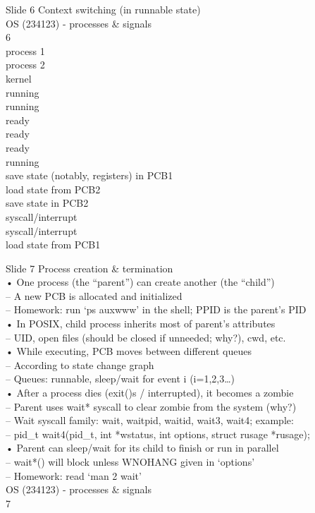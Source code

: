 \documentclass{beamer}
\begin{document}
\begin{frame}{Slide 6}
Context switching (in runnable state)\\OS (234123) - processes \& signals\\6\\process 1\\process 2\\kernel\\running\\running\\ready\\ready\\ready\\running\\save state (notably, registers) in PCB1\\load state from PCB2\\save state in PCB2\\syscall/interrupt\\syscall/interrupt\\load state from PCB1
\end{frame}
\begin{frame}{Slide 7}
Process creation \& termination\\• One process (the “parent”) can create another (the “child”)\\– A new PCB is allocated and initialized\\– Homework: run ‘ps auxwww’ in the shell; PPID is the parent’s PID\\• In POSIX, child process inherits most of parent’s attributes\\– UID, open files (should be closed if unneeded; why?), cwd, etc.\\• While executing, PCB moves between different queues\\– According to state change graph \\– Queues: runnable, sleep/wait for event i (i=1,2,3…)\\• After a process dies (exit()s / interrupted), it becomes a zombie\\– Parent uses wait* syscall to clear zombie from the system (why?)\\– Wait syscall family: wait, waitpid, waitid, wait3, wait4; example:\\– pid\_t wait4(pid\_t, int *wstatus, int options, struct rusage *rusage); \\• Parent can sleep/wait for its child to finish or run in parallel\\– wait*() will block unless WNOHANG given in ‘options’\\– Homework: read ‘man 2 wait’\\OS (234123) - processes \& signals\\7
\end{frame}
\end{document}
